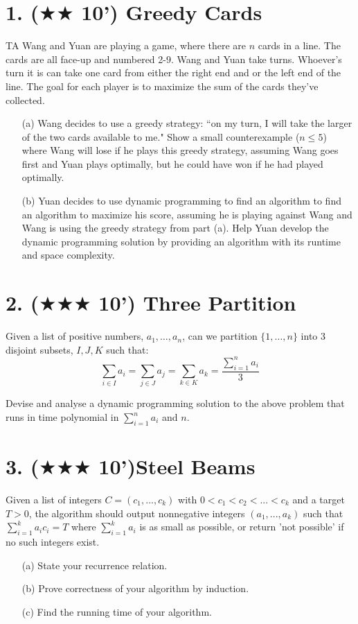 \documentclass{article}
\begin{document}
\section*{1. ($\bigstar\bigstar$ 10') Greedy Cards}

TA Wang and Yuan are playing a game, where there are $n$ cards in a line. The cards are all face-up and numbered 2-9. Wang and Yuan take turns. Whoever's turn it is can take one card from either the right end and or the left end of the line. The goal for each player is to maximize the sum of the cards they've collected.

\begin{enumerate}
\item[(a)] Wang decides to use a greedy strategy: ``on my turn, I will take the larger of the two cards available to me." Show a small counterexample ($n\leq 5$) where Wang will lose if he plays this greedy strategy, assuming Wang goes first and Yuan plays optimally, but he could have won if he had played optimally.
\item[(b)] Yuan decides to use dynamic programming to find an algorithm to find an algorithm to maximize his score, assuming he is playing against Wang and Wang is using the greedy strategy from part (a). Help Yuan develop the dynamic programming solution by providing an algorithm with its runtime and space complexity.
\end{enumerate}

\pagebreak
\section*{2. ($\bigstar\bigstar\bigstar$ 10') Three Partition}
Given a list of positive numbers, $a_1,\dots,a_n$, can we partition $\{1,\dots,n\}$ into 3 disjoint subsets, $I,J,K$ such that:
\[ \sum_{i\in I}a_i = \sum_{j\in J}a_j = \sum_{k\in K} a_k = \frac{\sum\limits_{i=1}^{n}a_i}{3} \]

Devise and analyse a dynamic programming solution to the above problem that runs in time polynomial in $\sum\limits_{i=1}^n a_i$ and $n$.
\pagebreak

\section*{3. ($\bigstar\bigstar\bigstar$ 10')Steel Beams}
Given a list of integers $C=(c_1,...,c_k)$ with $0<c_1<c_2<...<c_k$ and a target $T>0$, the algorithm should output nonnegative integers $(a_1,...,a_k)$ such that $\sum\limits_{i=1}^k a_ic_i=T$ where $\sum\limits_{i=1}^k a_i$ is as small as possible, or return 'not possible' if no such integers exist.
\begin{itemize}
\item[(a)]State your recurrence relation.
\item[(b)]Prove correctness of your algorithm by induction.
\item[(c)] Find the running time of your algorithm.
\end{itemize}
\pagebreak
\end{document}
